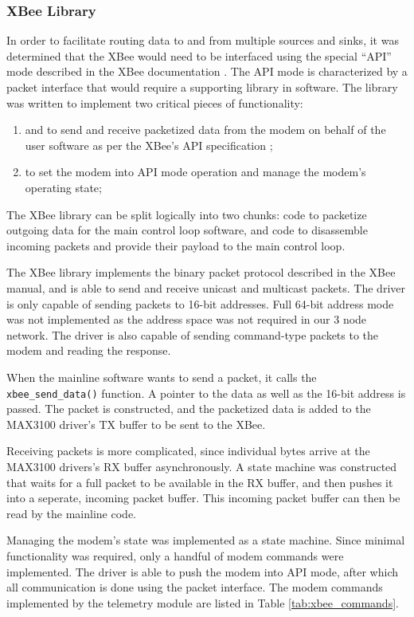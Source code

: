 \subsubsection{XBee Library}

In order to facilitate routing data to and from multiple sources and sinks, it was determined that the XBee would need to be interfaced using the special ``API'' mode described in the XBee documentation \cite{XBeeManual}. The API mode is characterized by a packet interface that would require a supporting library in software. The library was written to implement two critical pieces of functionality:

\begin{enumerate}
\item and to send and receive packetized data from the modem on behalf of the user software as per the XBee's API specification \cite{XBeeManual};
\item to set the modem into API mode operation and manage the modem's operating state;
\end{enumerate}

The XBee library can be split logically into two chunks: code to packetize outgoing data for the main control loop software, and code to disassemble incoming packets and provide their payload to the main control loop.

The XBee library implements the binary packet protocol described in the XBee manual, and is able to send and receive unicast and multicast packets. The driver is only capable of sending packets to 16-bit addresses. Full 64-bit address mode was not implemented as the address space was not required in our 3 node network. The driver is also capable of sending command-type packets to the modem and reading the response.

When the mainline software wants to send a packet, it calls the \verb|xbee_send_data()| function. A pointer to the data as well as the 16-bit address is passed. The packet is constructed, and the packetized data is added to the MAX3100 driver's TX buffer to be sent to the XBee.

Receiving packets is more complicated, since individual bytes arrive at the MAX3100 drivers's RX buffer asynchronously. A state machine was constructed that waits for a full packet to be available in the RX buffer, and then pushes it into a seperate, incoming packet buffer. This incoming packet buffer can then be read by the mainline code.

Managing the modem's state was implemented as a state machine. Since minimal functionality was required, only a handful of modem commands were implemented. The driver is able to push the modem into API mode, after which all communication is done using the packet interface. The modem commands implemented by the telemetry module are listed in Table \ref{tab:xbee_commands}.

